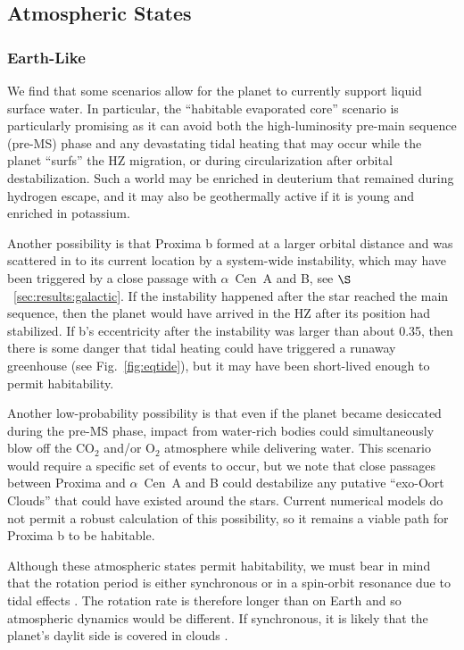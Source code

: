 \documentclass[preprint,12pt]{aastex}
\def\acen{{$\alpha$~Cen}}
\begin{document}
\subsection{Atmospheric States}
\label{sec:results:atmstates}

\subsubsection{Earth-Like}
\label{sec:results:atmstates:earthlike}

We find that some scenarios allow for the planet to currently support liquid
surface water. In particular, the ``habitable evaporated core'' scenario
\citep{Luger15} is particularly promising as it can avoid both the
high-luminosity pre-main sequence (pre-MS) phase and any devastating tidal
heating that may occur while the planet ``surfs'' the HZ migration, or
during circularization after orbital destabilization. Such a world may
be enriched in deuterium that remained during hydrogen escape, and it
may also be geothermally active if it is young and enriched in
potassium.

Another possibility is that Proxima b formed at a larger orbital
distance and was scattered in to its current location by a system-wide
instability, which may have been triggered by a close passage with
\acen~A and B, see $\S$~\ref{sec:results:galactic}. If the instability
happened after the star reached the main sequence, then the planet
would have arrived in the HZ after its position had stabilized. If b's
eccentricity after the instability was larger than about 0.35, then
there is some danger that tidal heating could have triggered a runaway
greenhouse (see Fig.~\ref{fig:eqtide}), but it may have been
short-lived enough to permit habitability.

Another low-probability possibility is that even if the planet became
desiccated during the pre-MS phase, impact from water-rich bodies
could simultaneously blow off the CO$_2$ and/or O$_2$ atmosphere while
delivering water. This scenario would require a specific set of events
to occur, but we note that close passages between Proxima and \acen~A
and B could destabilize any putative ``exo-Oort Clouds'' that could
have existed around the stars. Current numerical models do not permit
a robust calculation of this possibility, so it remains a viable path
for Proxima b to be habitable.

Although these atmospheric states permit habitability, we must bear in
mind that the rotation period is either synchronous or in a spin-orbit
resonance due to tidal effects \citep{Rodriguez12}. The rotation rate
is therefore longer than on Earth and so atmospheric dynamics would be
different. If synchronous, it is likely that the planet's daylit side
is covered in clouds \citep{Yang13}.
\end{document}

